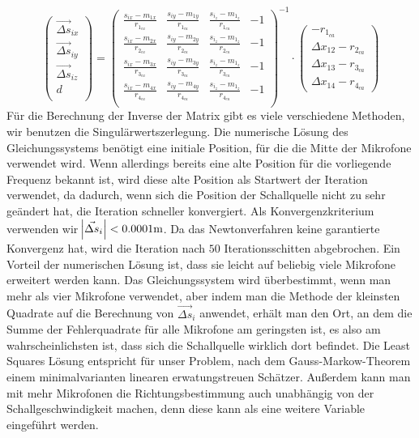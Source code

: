 $$
\begin{pmatrix}
\vec{\Delta{s}}_{ix} \\
\vec{\Delta{s}}_{iy} \\
\vec{\Delta{s}}_{iz} \\
                d \\
\end{pmatrix}
=
{\begin{pmatrix}
\frac{s_{ix} - m_{1x}}{r_{1_{ca}}} & \frac{s_{iy} - m_{1y}}{r_{1_{ca}}} & \frac{s_{i_z} - m_{1_z}}{r_{1_{ca}}} & -1 \\
\frac{s_{ix} - m_{2x}}{r_{2_{ca}}} & \frac{s_{iy} - m_{2y}}{r_{2_{ca}}} & \frac{s_{i_z} - m_{1_z}}{r_{2_{ca}}} & -1 \\
\frac{s_{ix} - m_{3x}}{r_{3_{ca}}} & \frac{s_{iy} - m_{3y}}{r_{3_{ca}}} & \frac{s_{i_z} - m_{1_z}}{r_{3_{ca}}} & -1 \\
\frac{s_{ix} - m_{4x}}{r_{4_{ca}}} & \frac{s_{iy} - m_{4y}}{r_{4_{ca}}} & \frac{s_{i_z} - m_{1_z}}{r_{4_{ca}}} & -1 \\
\end{pmatrix}}^{-1}
\cdot
\begin{pmatrix}
-r_{1_{ca}}\\
\Delta{x_{12}} - r_{2_{ca}}\\
\Delta{x_{13}} - r_{3_{ca}}\\
\Delta{x_{14}} - r_{4_{ca}}
\end{pmatrix}
$$
Für die Berechnung der Inverse der Matrix gibt es viele verschiedene Methoden, wir benutzen die Singulärwertszerlegung. Die numerische Lösung des Gleichungssystems benötigt eine initiale Position, für die die Mitte der Mikrofone verwendet wird. Wenn allerdings bereits eine alte Position für die vorliegende Frequenz bekannt ist, wird diese alte Position als Startwert der Iteration verwendet, da dadurch, wenn sich die Position der Schallquelle nicht zu sehr geändert hat, die Iteration schneller konvergiert. Als Konvergenzkriterium verwenden wir $\abs{\vec{\Delta{s}}_i} < 0.0001\mathrm{m}$. Da das Newtonverfahren keine garantierte Konvergenz hat, wird die Iteration nach $50$ Iterationsschitten abgebrochen.
Ein Vorteil der numerischen Lösung ist, dass sie leicht auf beliebig viele Mikrofone erweitert werden kann. Das Gleichungssystem wird überbestimmt, wenn man mehr als vier Mikrofone verwendet, aber indem man die Methode der kleinsten Quadrate auf die Berechnung von $\vec{\Delta{s}}_i$ anwendet, erhält man den Ort, an dem die Summe der Fehlerquadrate für alle Mikrofone am geringsten ist, es also am wahrscheinlichsten ist, dass sich die Schallquelle wirklich dort befindet. Die Least Squares Lösung entspricht für unser Problem, nach dem Gauss-Markow-Theorem einem minimalvarianten linearen erwatungstreuen Schätzer. Außerdem kann man mit mehr Mikrofonen die Richtungsbestimmung auch unabhängig von der Schallgeschwindigkeit machen, denn diese kann als eine weitere Variable eingeführt werden.
